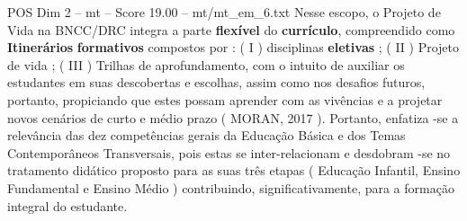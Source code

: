 \begin{textsample}{POS Dim 2 – mt – Score 19.00 – mt/mt\_em\_6.txt}
Nesse escopo, o Projeto de Vida na BNCC/DRC integra a parte \textbf{flexível} do \textbf{currículo}, compreendido como \textbf{Itinerários} \textbf{formativos} compostos por : ( I ) disciplinas \textbf{eletivas} ; ( II ) Projeto de vida ; ( III ) Trilhas de aprofundamento, com o intuito de auxiliar os estudantes em suas descobertas e escolhas, assim como nos desafios futuros, portanto, propiciando que estes possam aprender com as vivências e a projetar novos cenários de curto e médio prazo ( MORAN, 2017 ).
Portanto, enfatiza -se a relevância das dez competências gerais da Educação Básica e dos Temas Contemporâneos Transversais, pois estas se inter-relacionam e desdobram -se no tratamento didático proposto para as suas três etapas ( Educação Infantil, Ensino Fundamental e Ensino Médio ) contribuindo, significativamente, para a formação integral do estudante.

\end{textsample}
